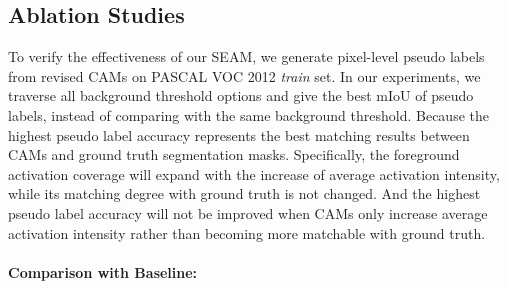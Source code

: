 \documentclass[10pt,twocolumn,letterpaper]{article}
\begin{document}
	\subsection{Ablation Studies}
	To verify the effectiveness of our SEAM, we generate pixel-level pseudo labels from revised CAMs on PASCAL VOC 2012 \textit{train} set. In our experiments, we traverse all background threshold options and give the best mIoU of pseudo labels, instead of comparing with the same background threshold. Because the highest pseudo label accuracy represents the best matching results between CAMs and ground truth segmentation masks. Specifically, the foreground activation coverage will expand with the increase of average activation intensity, while its matching degree with ground truth is not changed. And the highest pseudo label accuracy will not be improved when CAMs only increase average activation intensity rather than becoming more matchable with ground truth.
\paragraph{Comparison with Baseline:} 
	
\end{document}
